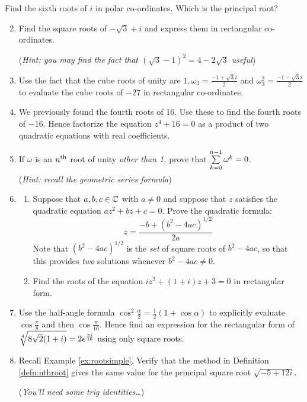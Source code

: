 \begin{exercises*}
	\exstart Find the sixth roots of $i$ in polar co-ordinates. Which is the principal root?
	\begin{enumerate}\setcounter{enumi}{1}
  	\item Find the square roots of $-\sqrt 3+i$ and express them in rectangular co-ordinates.\par
  	(\emph{Hint: you may find the fact that $(\sqrt 3-1)^2=4-2\sqrt 3$ useful})
  
	  \item Use the fact that the cube roots of unity are $1,\omega_3=\frac{-1+\sqrt 3 i}2$ and $\omega_3^2=\frac{-1-\sqrt 3 i}2$ to evaluate the cube roots of $-27$ in rectangular co-ordinates.
	 
	  \item We previously found the fourth roots of 16. Use these to find the fourth roots of $-16$. Hence factorize the equation $z^4+16=0$ as a product of two quadratic equations with real coefficients.
	  
	  \item If $\omega$ is an $n\textsuperscript{th}$ root of unity \emph{other than 1,} prove that $\smash[b]{\sum\limits_{k=0}^{n-1}\omega^k=0}$.\par
	  (\emph{Hint: recall the geometric series formula})
	  
	  \item\begin{enumerate}
	    \item Suppose that $a,b,c\in\mathbb{C}$ with $a\neq 0$ and suppose that $z$ satisfies the quadratic equation $az^2+bz+c=0$. Prove the quadratic formula:
	    \[
	    	z=\frac{-b+(b^2-4ac)^{1/2}}{2a}
	    \]
	    Note that $(b^2-4ac)^{1/2}$ is the \emph{set} of square roots of $b^2-4ac$, so that this provides \emph{two} solutions whenever $b^2-4ac\neq 0$.
	    \item Find the roots of the equation $iz^2+(1+i)z+3=0$ in rectangular form.
	  \end{enumerate} 
	  
	  \item\label{ex:fourthrootrect} Use the half-angle formula $\cos^2\!\frac\alpha 2=\frac 12(1+\cos\alpha)$ to explicitly evaluate $\cos\frac\pi 8$ and then $\cos\frac\pi{16}$. Hence find an expression for the rectangular form of $\sqrt[4]{8\sqrt 2(1+i)}=2e^{\frac{\pi i}{16}}$ using only square roots.
	  
	  \item Recall Example \ref{ex:rootsimple}. Verify that the method in Definition \ref{defn:nthroot} gives the same value for the principal square root $\sqrt{-5+12i}$.\par
	  (\emph{You'll need some trig identities\ldots})
	
	\end{enumerate}
\end{exercises*}